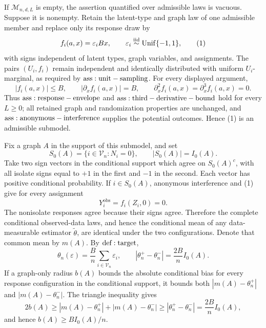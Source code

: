 If \(\mathcal M_{n,d,L}\) is empty, the assertion quantified over admissible laws is vacuous.  Suppose it is nonempty.  Retain the latent-type and graph law of one admissible member and replace only its response draw by
\[
 f_i(a,x)=\varepsilon_iBx,
 \qquad \varepsilon_i\overset{\mathrm{iid}}{\sim}{\rm Unif}\{-1,1\},
\tag{1}
\]
with signs independent of latent types, graph variables, and assignments.  The pairs \((U_i,f_i)\) remain independent and identically distributed with uniform \(U_i\)-marginal, as required by \({\rm ass:unit-sampling}\).  For every displayed argument,
\[
 |f_i(a,x)|\leq B,
 \qquad |\partial_xf_i(a,x)|=B,
 \qquad \partial_x^2f_i(a,x)=\partial_x^3f_i(a,x)=0.
\tag{2}
\]
Thus \({\rm ass:response-envelope}\) and \({\rm ass:third-derivative-bound}\) hold for every \(L\geq0\); all retained graph and randomization properties are unchanged, and \({\rm ass:anonymous-interference}\) supplies the potential outcomes.  Hence (1) is an admissible submodel.

Fix a graph \(A\) in the support of this submodel, and set
\[
 S_0(A)=\{i\in\mathcal V_n:N_i=0\},
 \qquad |S_0(A)|=I_0(A).
\tag{3}
\]
Take two sign vectors in the conditional support which agree on \(S_0(A)^c\), with all isolate signs equal to \(+1\) in the first and \(-1\) in the second.  Each vector has positive conditional probability.  If \(i\in S_0(A)\), anonymous interference and (1) give for every assignment
\[
 Y_i^{\mathrm{obs}}=f_i(Z_i,0)=0.
\tag{4}
\]
The nonisolate responses agree because their signs agree.  Therefore the complete conditional observed-data laws, and hence the conditional mean of any data-measurable estimator \(\widetilde\theta\), are identical under the two configurations.  Denote that common mean by \(m(A)\).  By \({\rm def:target}\),
\[
 \theta_n(\varepsilon)=\frac Bn\sum_{i\in\mathcal V_n}\varepsilon_i,
 \qquad |\theta_n^+-\theta_n^-|=\frac{2B}{n}I_0(A).
\tag{5}
\]
If a graph-only radius \(b(A)\) bounds the absolute conditional bias for every response configuration in the conditional support, it bounds both \(|m(A)-\theta_n^+|\) and \(|m(A)-\theta_n^-|\).  The triangle inequality gives
\[
 2b(A)\geq|m(A)-\theta_n^+|+|m(A)-\theta_n^-|
 \geq|\theta_n^+-\theta_n^-|=\frac{2B}{n}I_0(A),
\]
and hence \(b(A)\geq BI_0(A)/n\).

